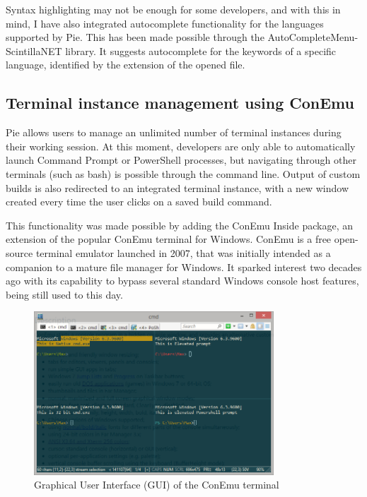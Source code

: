 Syntax highlighting may not be enough for some developers, and with this in mind, I have also integrated autocomplete functionality for the languages supported by Pie. This has been made possible through the AutoCompleteMenu-ScintillaNET \cite{autocompletemenu} library. It suggests autocomplete for the keywords of a specific language, identified by the extension of the opened file.

\subsection{Terminal instance management using ConEmu}

Pie allows users to manage an unlimited number of terminal instances during their working session. At this moment, developers are only able to automatically launch Command Prompt or PowerShell processes, but navigating through other terminals (such as bash) is possible through the command line. Output of custom builds is also redirected to an integrated terminal instance, with a new window created every time the user clicks on a saved build command.

This functionality was made possible by adding the ConEmu Inside \cite{conemu-inside} package, an extension of the popular ConEmu \cite{conemu} terminal for Windows. ConEmu is a free open-source terminal emulator launched in 2007, that was initially intended as a companion to a mature file manager for Windows. It sparked interest two decades ago with its capability to bypass several standard Windows console host features, being still used to this day.

\begin{figure}[h]
\centering
\includegraphics[width=0.8\textwidth]{images/ConEmu-Maximus5.png}
\caption{Graphical User Interface (GUI) of the ConEmu terminal}
\label{fig:fig2,1.}
\end{figure}


